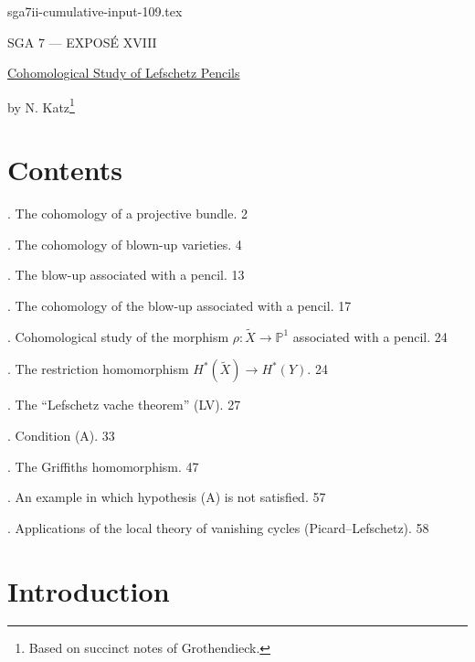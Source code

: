 \begin{filecontents*}{sga7ii-cumulative-input-109.tex}
\clearpage
\begin{center}
{\large SGA 7 --- EXPOS\'E XVIII}\par
\vspace{2em}
{\Large\underline{Cohomological Study of Lefschetz Pencils}}\par
\vspace{1.5em}
{\large by N. Katz\footnote{Based on succinct notes of Grothendieck.}}
\end{center}

\section*{Contents}

. The cohomology of a projective bundle. \hfill 2

. The cohomology of blown-up varieties. \hfill 4

. The blow-up associated with a pencil. \hfill 13

. The cohomology of the blow-up associated with a pencil. \hfill 17

. Cohomological study of the morphism
$\rho:\widetilde X\longrightarrow\mathbb P^1$ associated with a pencil.
\hfill 24

\noindent{}. The restriction homomorphism
$H^*(\widetilde X)\longrightarrow H^*(Y)$. \hfill 24

\noindent{}. The ``Lefschetz vache theorem'' (LV). \hfill 27

\noindent{}. Condition (A). \hfill 33

\noindent{}. The Griffiths homomorphism. \hfill 47

\noindent{}. An example in which hypothesis (A) is not satisfied.
\hfill 57

. Applications of the local theory of vanishing cycles
(Picard--Lefschetz). \hfill 58

\section*{Introduction}


\end{filecontents*}
